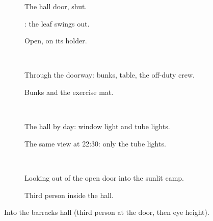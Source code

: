 \begin{figure}[p]
\centering
\begin{subfigure}[t]{0.325\linewidth}\caption{The hall door, shut.}\end{subfigure}\hfill
\begin{subfigure}[t]{0.325\linewidth}\caption{: the leaf swings out.}\end{subfigure}\hfill
\begin{subfigure}[t]{0.325\linewidth}\caption{Open, on its holder.}\end{subfigure}\\[1.2mm]
\begin{subfigure}[t]{0.49\linewidth}\caption{Through the doorway: bunks, table, the off-duty crew.}\end{subfigure}\hfill
\begin{subfigure}[t]{0.49\linewidth}\caption{Bunks and the exercise mat.}\end{subfigure}\\[1.2mm]
\begin{subfigure}[t]{0.49\linewidth}\caption{The hall by day: window light and tube lights.}\end{subfigure}\hfill
\begin{subfigure}[t]{0.49\linewidth}\caption{The same view at 22:30: only the tube lights.}\end{subfigure}\\[1.2mm]
\begin{subfigure}[t]{0.49\linewidth}\caption{Looking out of the open door into the sunlit camp.}\end{subfigure}\hfill
\begin{subfigure}[t]{0.49\linewidth}\caption{Third person inside the hall.}\end{subfigure}
\caption{Into the barracks hall (third person at the door, then eye height).}
\label{fig:walk-hall}
\end{figure}

